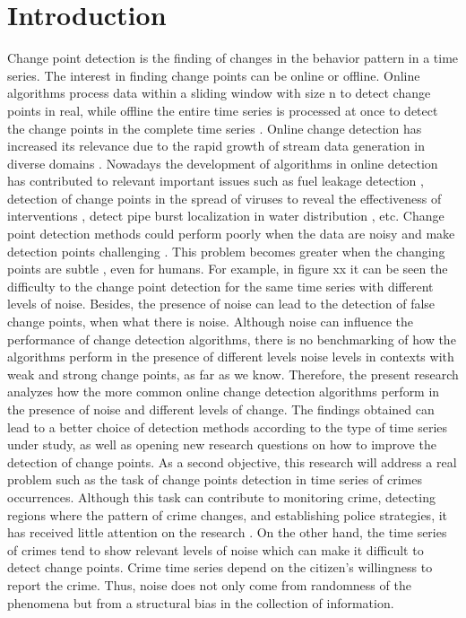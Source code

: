\documentclass[journal,article,submit,pdftex,moreauthors]{Definitions/mdpi}
\begin{document}
\setcounter{section}{0} %


\section{Introduction}

Change point detection is the finding of changes in the behavior pattern in a time series. The interest in finding change points can be online or offline. Online algorithms process data within a sliding window with size n to detect change points in real, while offline the entire time series is processed at once to detect the change points in the complete time series \cite{aminikhanghahi2017survey}. Online change detection has increased its relevance due to the rapid growth of stream data generation in diverse domains \cite{namoano2019online}. Nowadays the development of algorithms in online detection has contributed to relevant important issues such as fuel leakage detection \cite{chu2025real}, detection of change points in the spread of viruses to reveal the effectiveness of interventions \cite{dehning2020inferring}, detect pipe burst localization in water distribution \cite{mzembegwa2024real}, etc. 
Change point detection methods could perform poorly when the data are noisy \cite{chen2016general} and make detection points challenging \cite{gold2018doubly}. This problem becomes greater when the changing points are subtle \cite{chu2025real}, even for humans. For example, in figure xx it can be seen the difficulty to the change point detection for the same time series with different levels of noise. Besides, the presence of noise can lead to the detection of false change points, when what there is noise. 
Although noise can influence the performance of change detection algorithms, there is no benchmarking of how the algorithms perform in the presence of different levels noise levels in contexts with weak and strong change points, as far as we know. Therefore, the present research analyzes how the more common online change detection algorithms perform in the presence of noise and different levels of change.  The findings obtained can lead to a better choice of detection methods according to the type of time series under study, as well as opening new research questions on how to improve the detection of change points.
As a second objective, this research will address a real problem such as the task of change points detection in time series of crimes occurrences. Although this task can contribute to monitoring crime, detecting regions where the pattern of crime changes, and establishing police strategies, it has received little attention on the research \cite{konstantinou2023trend}. On the other hand, the time series of crimes tend to show relevant levels of noise which can make it difficult to detect change points. Crime time series depend on the citizen's willingness to report the crime. Thus, noise does not only come from randomness of the phenomena but from a structural bias in the collection of information.
\end{document}
